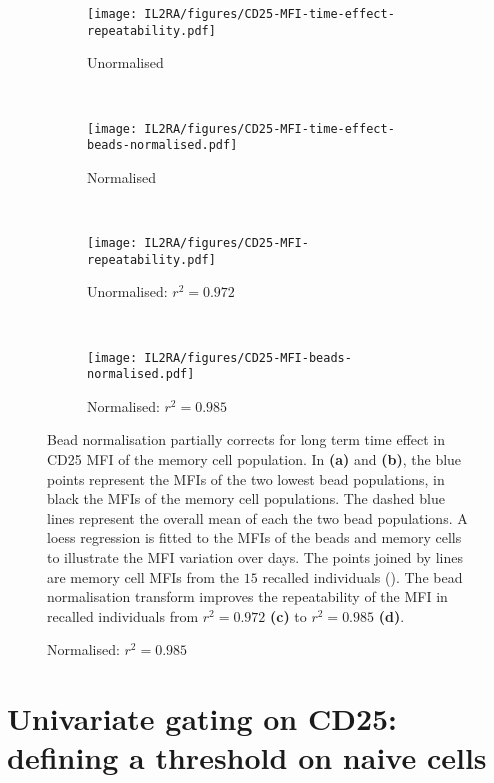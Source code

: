 \begin{figure}[ht]
\centering
\begin{subfigure}[b]{.4\textwidth}
    \centering
    \texttt{[image: IL2RA/figures/CD25-MFI-time-effect-repeatability.pdf]}
    \caption{Unormalised}
\end{subfigure}
~
\begin{subfigure}[b]{.4\textwidth}
    \centering
    \texttt{[image: IL2RA/figures/CD25-MFI-time-effect-beads-normalised.pdf]}
    \caption{Normalised}
\end{subfigure}
~
\begin{subfigure}[b]{.4\textwidth}
    \centering
    \texttt{[image: IL2RA/figures/CD25-MFI-repeatability.pdf]}
    \caption{Unormalised: $r^2=0.972$}
\end{subfigure}
~
\begin{subfigure}[b]{.4\textwidth}
    \centering
    \texttt{[image: IL2RA/figures/CD25-MFI-beads-normalised.pdf]}
    \caption{Normalised: $r^2=0.985$}
\end{subfigure}
{Bead normalisation partially corrects for long term time effect in CD25 MFI of the memory cell population.}
{
  In \textbf{(a)} and \textbf{(b)}, the blue points represent the  MFIs of the two lowest bead populations,
  in black the  MFIs of the memory cell populations.
  The dashed blue lines represent the overall mean of each the two bead populations.
  A loess regression is fitted to the MFIs of the beads and memory cells to illustrate the MFI variation over days.
  The points joined by lines are memory cell  MFIs from the $15$ recalled individuals ().
  The bead normalisation transform  improves the repeatability of the MFI in recalled individuals from $r^2=0.972$ \textbf{(c)} to $r^2=0.985$ \textbf{(d)}.
}
\end{figure}




\section{Univariate gating on CD25: defining a \positive threshold on naive cells}

